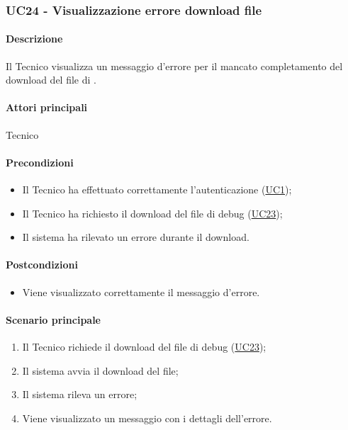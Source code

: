 \subsubsection{UC24 - Visualizzazione errore download file}\label{UC24}
\paragraph*{Descrizione}
Il Tecnico visualizza un messaggio d'errore per il mancato completamento del download del file di .

\paragraph*{Attori principali}
Tecnico

\paragraph*{Precondizioni}
\begin{itemize}
  \item Il Tecnico ha effettuato correttamente l'autenticazione (\hyperref[UC1]{UC1});
  \item Il Tecnico ha richiesto il download del file di debug (\hyperref[UC23]{UC23});
  \item Il sistema ha rilevato un errore durante il download.
\end{itemize}

\paragraph*{Postcondizioni}
\begin{itemize}
  \item Viene visualizzato correttamente il messaggio d'errore.
\end{itemize}

\paragraph*{Scenario principale}
\begin{enumerate}
  \item Il Tecnico richiede il download del file di debug (\hyperref[UC23]{UC23});
  \item Il sistema avvia il download del file;
  \item Il sistema rileva un errore;
  \item Viene visualizzato un messaggio con i dettagli dell'errore.
\end{enumerate}